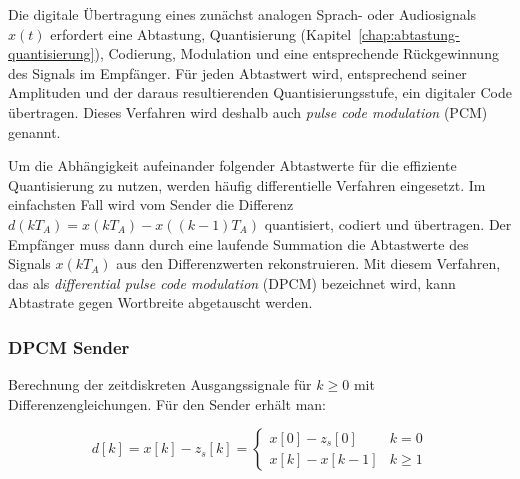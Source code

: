 \begin{beispiel}
Die digitale Übertragung eines zunächst analogen Sprach- oder Audiosignals $x(t)$ erfordert eine Abtastung, Quantisierung (Kapitel~\ref{chap:abtastung-quantisierung}), Codierung, Modulation und eine entsprechende Rückgewinnung des Signals im Empfänger. Für jeden Abtastwert wird, entsprechend seiner Amplituden und der daraus resultierenden Quantisierungsstufe, ein digitaler Code übertragen. Dieses Verfahren wird deshalb auch \textit{pulse code modulation} (PCM) genannt.

Um die Abhängigkeit aufeinander folgender Abtastwerte für die effiziente Quantisierung zu nutzen, werden häufig differentielle Verfahren eingesetzt. Im einfachsten Fall wird vom Sender die Differenz $d(kT_A) = x(kT_A) - x((k-1)T_A)$ quantisiert, codiert und übertragen. Der Empfänger muss dann durch eine laufende Summation die Abtastwerte des Signals $x(kT_A)$ aus den Differenzwerten rekonstruieren. Mit diesem Verfahren, das als \textit{differential pulse code modulation} (DPCM) bezeichnet wird, kann Abtastrate gegen Wortbreite abgetauscht werden.

\subsubsection*{DPCM Sender}

\begin{center}
\end{center}

Berechnung der zeitdiskreten Ausgangssignale für $k \geq 0$ mit Differenzengleichungen. Für den Sender erhält man:

$$
d[k] = x[k] - z_s[k] = \begin{cases} x[0] - z_s[0] & k = 0 \\ x[k] - x[k-1] & k \geq 1 \end{cases}
$$


\end{beispiel}
